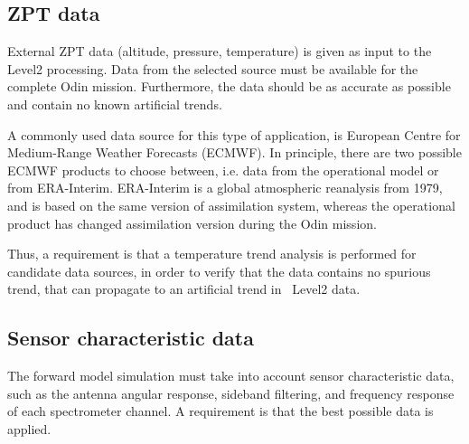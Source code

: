\subsection{ZPT data}
External ZPT data (altitude, pressure, temperature) is given as input
to the Level2 processing. Data from the selected source must be available
for the complete Odin mission. Furthermore, the data should be as accurate
as possible %
and contain no known artificial trends.

A commonly used data source for this type of application, is
European Centre for Medium-Range Weather Forecasts (ECMWF).
In principle, there are two possible ECMWF products to choose
between, i.e. data from the operational model or from   
ERA-Interim. ERA-Interim is a global atmospheric reanalysis from 1979,
and is based on the same version of assimilation system,
whereas the operational product has changed assimilation
version during the Odin mission. 
 
Thus, a requirement is that a temperature trend analysis is performed
for candidate data sources, in order to verify that the data contains
no spurious trend, that can propagate to an artificial trend in
\smr\ Level2 data.
 

\subsection{Sensor characteristic data}  
The forward model simulation must take into account sensor characteristic data,
such as the antenna angular response, sideband filtering, and frequency response 
of each spectrometer channel. A requirement is that the best possible
data is applied. 



